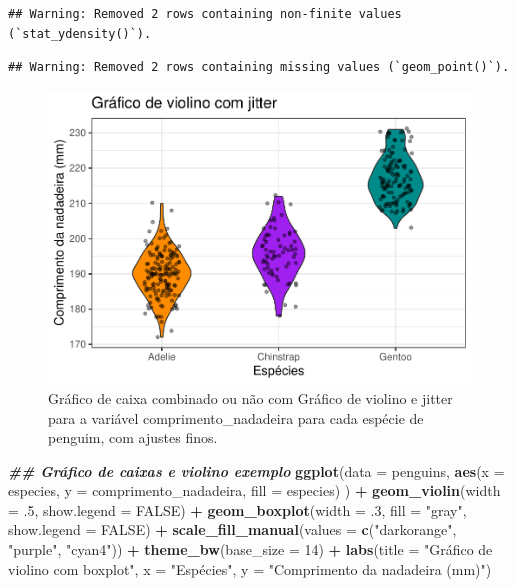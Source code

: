 \documentclass[
]{article}
\newenvironment{Shaded}{\begin{snugshade}}{\end{snugshade}}
\newcommand{\AttributeTok}[1]{\textcolor[rgb]{0.13,0.29,0.53}{#1}}
\newcommand{\ConstantTok}[1]{\textcolor[rgb]{0.56,0.35,0.01}{#1}}
\newcommand{\DecValTok}[1]{\textcolor[rgb]{0.00,0.00,0.81}{#1}}
\newcommand{\DocumentationTok}[1]{\textcolor[rgb]{0.56,0.35,0.01}{\textbf{\textit{#1}}}}
\newcommand{\FunctionTok}[1]{\textcolor[rgb]{0.13,0.29,0.53}{\textbf{#1}}}
\newcommand{\NormalTok}[1]{#1}
\newcommand{\SpecialCharTok}[1]{\textcolor[rgb]{0.81,0.36,0.00}{\textbf{#1}}}
\newcommand{\StringTok}[1]{\textcolor[rgb]{0.31,0.60,0.02}{#1}}
\begin{document}
\begin{verbatim}
## Warning: Removed 2 rows containing non-finite values (`stat_ydensity()`).
\end{verbatim}

\begin{verbatim}
## Warning: Removed 2 rows containing missing values (`geom_point()`).
\end{verbatim}

\begin{figure}
\centering
\includegraphics{epr_files/figure-latex/fig-boxplot-violin-fino-2.pdf}
\caption{\label{fig:fig-boxplot-violin-fino-2}Gráfico de caixa combinado ou não com Gráfico de violino e jitter para a variável comprimento\_nadadeira para cada espécie de penguim, com ajustes finos.}
\end{figure}

\begin{Shaded}
\begin{Highlighting}[]
\DocumentationTok{\#\# Gráfico de caixas e violino exemplo}
\FunctionTok{ggplot}\NormalTok{(}\AttributeTok{data =}\NormalTok{ penguins, }
       \FunctionTok{aes}\NormalTok{(}\AttributeTok{x =}\NormalTok{ especies, }\AttributeTok{y =}\NormalTok{ comprimento\_nadadeira, }\AttributeTok{fill =}\NormalTok{ especies)}
\NormalTok{       ) }\SpecialCharTok{+}
    \FunctionTok{geom\_violin}\NormalTok{(}\AttributeTok{width =}\NormalTok{ .}\DecValTok{5}\NormalTok{, }\AttributeTok{show.legend =} \ConstantTok{FALSE}\NormalTok{) }\SpecialCharTok{+}
    \FunctionTok{geom\_boxplot}\NormalTok{(}\AttributeTok{width =}\NormalTok{ .}\DecValTok{3}\NormalTok{, }\AttributeTok{fill =} \StringTok{"gray"}\NormalTok{, }\AttributeTok{show.legend =} \ConstantTok{FALSE}\NormalTok{) }\SpecialCharTok{+}
    \FunctionTok{scale\_fill\_manual}\NormalTok{(}\AttributeTok{values =} \FunctionTok{c}\NormalTok{(}\StringTok{"darkorange"}\NormalTok{, }\StringTok{"purple"}\NormalTok{, }\StringTok{"cyan4"}\NormalTok{)) }\SpecialCharTok{+}
    \FunctionTok{theme\_bw}\NormalTok{(}\AttributeTok{base\_size =} \DecValTok{14}\NormalTok{) }\SpecialCharTok{+}
    \FunctionTok{labs}\NormalTok{(}\AttributeTok{title =} \StringTok{"Gráfico de violino com boxplot"}\NormalTok{, }\AttributeTok{x =} \StringTok{"Espécies"}\NormalTok{, }\AttributeTok{y =} \StringTok{"Comprimento da nadadeira (mm)"}\NormalTok{)}
\end{Highlighting}
\end{Shaded}
\end{document}
